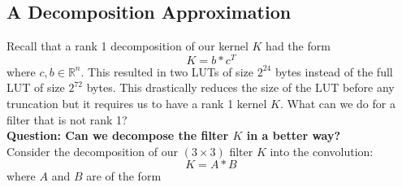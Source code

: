 \documentclass[12pt]{amsart}
\theoremstyle{definition}
\theoremstyle{remark}
\numberwithin{thm}{section}
\begin{document}
\subsection{A Decomposition Approximation}
Recall that a rank 1 decomposition of our kernel $K$ had the form $$
K=b*c^T
$$
where $c,b \in \mathbb{R}^n$. This resulted in two LUTs of size $2^{24}$ bytes instead of the full LUT of size $2^{72}$ bytes. This drastically reduces the size of the LUT before any truncation but it requires us to have a rank 1 kernel $K$. What can we do for a filter that is not rank 1?
\\
\textbf{Question: Can we decompose the filter $K$ in a better way?}
\\
Consider the decomposition of our $(3\times 3)$ filter $K$ into the convolution:
$$K=A*B$$
where $A$ and $B$ are of the form
\end{document}
